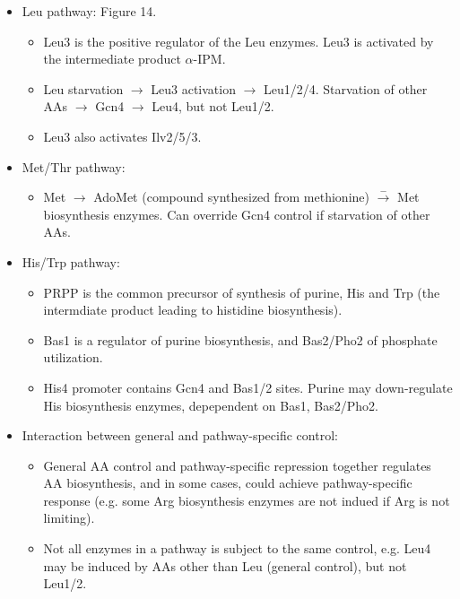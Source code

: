 \documentclass{report}
\begin{document}
\begin{itemize}
\item Leu pathway: Figure 14.
\begin{itemize}
	\item Leu3 is the positive regulator of the Leu enzymes. Leu3 is activated by the intermediate product $\alpha$-IPM. 
	\item Leu starvation $\rightarrow$ Leu3 activation $\rightarrow$ Leu1/2/4. Starvation of other AAs $\rightarrow$ Gcn4 $\rightarrow$ Leu4, but not Leu1/2.  
	\item Leu3 also activates Ilv2/5/3. 
\end{itemize}

\item Met/Thr pathway: 
\begin{itemize}
	\item Met $\rightarrow$ AdoMet (compound synthesized from methionine) $\stackrel{-}{\rightarrow}$ Met biosynthesis enzymes. Can override Gcn4 control if starvation of other AAs. 
\end{itemize}

\item His/Trp pathway: 
\begin{itemize}
	\item PRPP is the common precursor of synthesis of purine, His and Trp (the intermdiate product leading to histidine biosynthesis). 
	\item Bas1 is a regulator of purine biosynthesis, and Bas2/Pho2 of phosphate utilization.  
	\item His4 promoter contains Gcn4 and Bas1/2 sites. Purine may down-regulate His biosynthesis enzymes, depependent on Bas1, Bas2/Pho2. 
\end{itemize}

\item Interaction between general and pathway-specific control: 
\begin{itemize}
	\item General AA control and pathway-specific repression together regulates AA biosynthesis, and in some cases, could achieve pathway-specific response (e.g. some Arg biosynthesis enzymes are not indued if Arg is not limiting).
	\item Not all enzymes in a pathway is subject to the same control, e.g. Leu4 may be induced by AAs other than Leu (general control), but not Leu1/2. 
\end{itemize}
\end{itemize}
\end{document}
